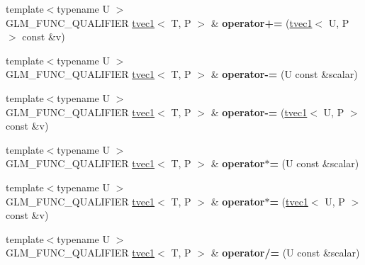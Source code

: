 \begin{DoxyCompactItemize}
\item 
\hypertarget{structglm_1_1tvec1_ac579b8e14a7aa466cb0185e0e5fb7b3d}{{\footnotesize template$<$typename U $>$ }\\G\-L\-M\-\_\-\-F\-U\-N\-C\-\_\-\-Q\-U\-A\-L\-I\-F\-I\-E\-R \hyperlink{structglm_1_1tvec1}{tvec1}$<$ T, P $>$ \& {\bfseries operator+=} (\hyperlink{structglm_1_1tvec1}{tvec1}$<$ U, P $>$ const \&v)}\label{structglm_1_1tvec1_ac579b8e14a7aa466cb0185e0e5fb7b3d}

\item 
\hypertarget{structglm_1_1tvec1_a211a882bfc5b697cd532b617bb7e4b67}{{\footnotesize template$<$typename U $>$ }\\G\-L\-M\-\_\-\-F\-U\-N\-C\-\_\-\-Q\-U\-A\-L\-I\-F\-I\-E\-R \hyperlink{structglm_1_1tvec1}{tvec1}$<$ T, P $>$ \& {\bfseries operator-\/=} (U const \&scalar)}\label{structglm_1_1tvec1_a211a882bfc5b697cd532b617bb7e4b67}

\item 
\hypertarget{structglm_1_1tvec1_adda6b97039322228b22bae46dc2412f2}{{\footnotesize template$<$typename U $>$ }\\G\-L\-M\-\_\-\-F\-U\-N\-C\-\_\-\-Q\-U\-A\-L\-I\-F\-I\-E\-R \hyperlink{structglm_1_1tvec1}{tvec1}$<$ T, P $>$ \& {\bfseries operator-\/=} (\hyperlink{structglm_1_1tvec1}{tvec1}$<$ U, P $>$ const \&v)}\label{structglm_1_1tvec1_adda6b97039322228b22bae46dc2412f2}

\item 
\hypertarget{structglm_1_1tvec1_abb370a2ee56366a28cd6d2da367a71c4}{{\footnotesize template$<$typename U $>$ }\\G\-L\-M\-\_\-\-F\-U\-N\-C\-\_\-\-Q\-U\-A\-L\-I\-F\-I\-E\-R \hyperlink{structglm_1_1tvec1}{tvec1}$<$ T, P $>$ \& {\bfseries operator$\ast$=} (U const \&scalar)}\label{structglm_1_1tvec1_abb370a2ee56366a28cd6d2da367a71c4}

\item 
\hypertarget{structglm_1_1tvec1_ad4cb2d433838e6595769a4239aa5a47c}{{\footnotesize template$<$typename U $>$ }\\G\-L\-M\-\_\-\-F\-U\-N\-C\-\_\-\-Q\-U\-A\-L\-I\-F\-I\-E\-R \hyperlink{structglm_1_1tvec1}{tvec1}$<$ T, P $>$ \& {\bfseries operator$\ast$=} (\hyperlink{structglm_1_1tvec1}{tvec1}$<$ U, P $>$ const \&v)}\label{structglm_1_1tvec1_ad4cb2d433838e6595769a4239aa5a47c}

\item 
\hypertarget{structglm_1_1tvec1_a388974cc786872ef92cdbb4139d89fe3}{{\footnotesize template$<$typename U $>$ }\\G\-L\-M\-\_\-\-F\-U\-N\-C\-\_\-\-Q\-U\-A\-L\-I\-F\-I\-E\-R \hyperlink{structglm_1_1tvec1}{tvec1}$<$ T, P $>$ \& {\bfseries operator/=} (U const \&scalar)}\label{structglm_1_1tvec1_a388974cc786872ef92cdbb4139d89fe3}


\end{DoxyCompactItemize}
